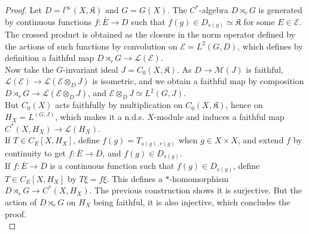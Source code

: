 \begin{proof}
Let $D=l^\infty(X,\mathfrak K)$ and $G=G(X)$. The $C^*$-algebra $D\rtimes_r G$ is generated by continuous functions $f : \overline E \rightarrow D$ such that $f(g)\in D_{s(g)}\simeq \mathfrak K$ for some $E\in \mathcal E$. The crossed product is obtained as the closure in the norm operator defined by the actions of such functions by convolution on $\mathcal E = L^2(G,D)$, which defines by definition a faithful map $D\rtimes_r G \rightarrow \mathcal L(\mathcal E)$.\\

Now take the $G$-invariant ideal $J= C_0(X,\mathfrak K)$. As $D\rightarrow \mathcal M(J)$ is faithful, $\mathcal L(\mathcal E)\rightarrow \mathcal L(\mathcal E\otimes_{D} J)$ is isometric, and we obtain a faithful map by composition $D\rtimes_r G \rightarrow \mathcal L(\mathcal E\otimes_D J)$, and $\mathcal E\otimes_D J \simeq L^2(G,J)$.\\

But $C_0(X)$ acts faithfully by multiplication on $C_0(X,\mathfrak K)$, hence on $H_X=L^(G,J)$, which makes it a n.d.s. $X$-module and induces a faithful map $C^*(X,H_X) \rightarrow \mathcal L(H_X)$.\\

If $T\in C_E[X,H_X]$, define $f(g)=T_{s(g),r(g)}$ when $g\in X\times X$, and extend $f$ by continuity to get $f : \overline E \rightarrow D$, and $f(g)\in D_{s(g)}$.\\

If $f:\overline E \rightarrow D$ is a continuous function such that $f(g)\in D_{s(g)}$, define $T\in C_E[X,H_X]$ by $T\xi = f\xi$. This defines a $*$-homomorphism $D\rtimes_r G \rightarrow C^*(X,H_X)$. The previous construction shows it is surjective. But the action of $D\rtimes_r G$ on $H_X$ being faithful, it is also injective, which concludes the proof.\\
\end{proof}



































